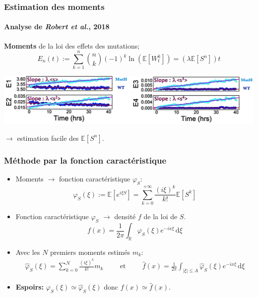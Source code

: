 \documentclass{beamer}
\newcommand{\pth}[1]{\left(#1\right)}
\newcommand{\cro}[1]{\left[#1\right]}
\newcommand{\abs}[1]{\left|#1\right|}
\newcommand{\et}{\hspace{1cm}\text{et}\hspace{1cm}}
\newcommand{\de}{\,\text{d}}
\newcommand{\Esp}[1]{\mathbb{E}\cro{#1}}
\begin{document}
\begin{frame}
  \frametitle{Estimation des moments}

  \framesubtitle{Analyse de \emph{Robert et al.}, 2018}

  
\textbf{Moments} de la loi des effets des mutations;
 \[E_n(t):=\sum_{k=1}^n\binom{n}{k}(-1)^k\ln\pth{\Esp{W_t^k}}=\pth{\lambda\Esp{S^n}}t\]
 \pause
    \vspace{0.7cm}
 \begin{centering}
 
    \includegraphics[scale=0.55]{img/Moments_estimation.png}
 \end{centering}
    \vspace{0.7cm}
 
$\to$ estimation facile des $\Esp{S^n}$.
\end{frame}


\begin{frame}
  \frametitle{Méthode par la fonction caractéristique}
  
  \begin{itemize}[label=$\bullet$]
  \item Moments $\to$ fonction caractéristique $\varphi_S$: 
    \[\varphi_S(\xi):=\Esp{e^{i\xi S}}=\sum_{k=0}^{+\infty}\frac{(i\xi)^k}{k!}\Esp{S^k}\]
    \pause
  \item Fonction caractéristique $\varphi_S$ $\to$ densité $f$ de la loi de $S$.
    \[f(x) = \frac1{2\pi} \int_{\mathbb R}\varphi_S(\xi)e^{-ix\xi}\de\xi\]
    \pause
  \item Avec les $N$ premiers moments estimés $m_k$:
    \begin{align*}
      \hat{\varphi}_S(\xi)=\sum_{k=0}^{N}\frac{(i\xi)^k}{k!}m_k
      \et\hat{f}(x)= \frac1{2\pi} \int_{\abs{\xi}\leqslant A}\hat\varphi_S(\xi)e^{-ix\xi}\de\xi
    \end{align*}
    \vspace{0.3cm}
    
  \item  \textbf{Espoirs:} $\varphi_S(\xi)\simeq \hat{\varphi}_S(\xi)$ donc $f(x)\simeq\hat{f}(x)$.
  \end{itemize}
  
\end{frame}
\end{document}
